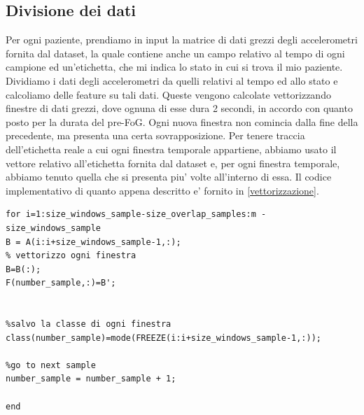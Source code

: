 \subsection{Divisione dei dati}
Per ogni paziente, prendiamo in input la matrice di dati grezzi degli accelerometri fornita dal dataset, la quale contiene anche un campo relativo al tempo di ogni campione ed un'etichetta, che mi indica lo stato in cui si trova il mio paziente. Dividiamo i dati degli accelerometri da quelli relativi al tempo ed allo stato e calcoliamo delle feature su tali dati. Queste vengono calcolate vettorizzando finestre di dati grezzi, dove ognuna di esse dura 2 secondi, in accordo con quanto posto per la durata del pre-FoG. Ogni nuova finestra non comincia dalla fine della precedente, ma presenta una certa sovrapposizione. Per tenere traccia dell'etichetta reale a cui ogni finestra temporale appartiene, abbiamo usato il vettore relativo all'etichetta fornita dal dataset e, per ogni finestra temporale, abbiamo tenuto quella che si presenta piu' volte all'interno di essa. Il codice implementativo di quanto appena descritto e' fornito in \ref{vettorizzazione}.
\begin{lstlisting}[style=Matlab-editor,frame=single, caption=Vettorizzazione dei dati degli accelerometri, label=vettorizzazione]
for i=1:size_windows_sample-size_overlap_samples:m - size_windows_sample
B = A(i:i+size_windows_sample-1,:);
% vettorizzo ogni finestra
B=B(:);
F(number_sample,:)=B';


%salvo la classe di ogni finestra
class(number_sample)=mode(FREEZE(i:i+size_windows_sample-1,:));

%go to next sample
number_sample = number_sample + 1;

end
\end{lstlisting}
